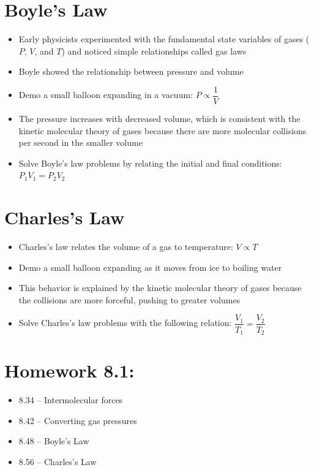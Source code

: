 \documentclass[12pt, openany, letterpaper]{memoir}
\begin{document}
\section{Boyle's Law}
\begin{itemize}
	\item Early physicists experimented with the fundamental state variables of gases ($P$, $V$, and $T$) and noticed simple relationships called gas laws
	\item Boyle showed the relationship between pressure and volume
	\item Demo a small balloon expanding in a vacuum: $P\propto \dfrac{1}{V}$
	\item The pressure increases with decreased volume, which is consistent with the kinetic molecular theory of gases because there are more molecular collisions per second in the smaller volume
	\item Solve Boyle's law problems by relating the initial and final conditions: $P_1V_1=P_2V_2$
\end{itemize}

\section{Charles's Law}
\begin{itemize}
	\item Charles's law relates the volume of a gas to temperature: $V\propto T$
	\item Demo a small balloon expanding as it moves from ice to boiling water
	\item This behavior is explained by the kinetic molecular theory of gases because the collisions are more forceful, pushing to greater volumes
	\item Solve Charles's law problems with the following relation: $\dfrac{V_1}{T_1}=\dfrac{V_2}{T_2}$
\end{itemize}

\section*{Homework 8.1:}
\begin{itemize}
	\item 8.34 -- Intermolecular forces
	\item 8.42 -- Converting gas pressures
	\item 8.48 -- Boyle's Law
	\item 8.56 -- Charles's Law
\end{itemize}
\end{document}
